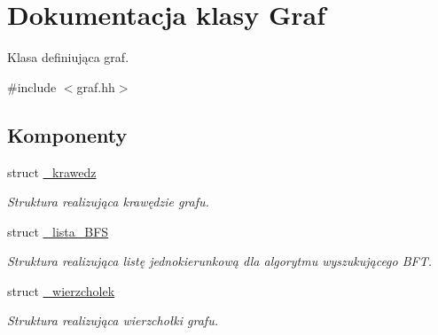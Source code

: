 \hypertarget{class_graf}{\section{\-Dokumentacja klasy \-Graf}
\label{class_graf}
}


\-Klasa definiująca graf.  




{\ttfamily \#include $<$graf.\-hh$>$}

\subsection*{\-Komponenty}
\begin{DoxyCompactItemize}
\item 
struct \hyperlink{struct_graf_1_1__krawedz}{\-\_\-krawedz}
\begin{DoxyCompactList}\small\item\em \-Struktura realizująca krawędzie grafu. \end{DoxyCompactList}\item 
struct \hyperlink{struct_graf_1_1__lista___b_f_s}{\-\_\-lista\-\_\-\-B\-F\-S}
\begin{DoxyCompactList}\small\item\em \-Struktura realizująca listę jednokierunkową dla algorytmu wyszukującego \-B\-F\-T. \end{DoxyCompactList}\item 
struct \hyperlink{struct_graf_1_1__wierzcholek}{\-\_\-wierzcholek}
\begin{DoxyCompactList}\small\item\em \-Struktura realizująca wierzchołki grafu. \end{DoxyCompactList}\end{DoxyCompactItemize}
